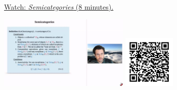 
\begin{minipage}{10cm}
    \href{https://act4e-spring21.netlify.app/videos/spring2021-semicats-cats:semicats.html}{Watch: \emph{Semicategories} (8 minutes).}
        
    \href{https://act4e-spring21.netlify.app/videos/spring2021-semicats-cats:semicats.html}{\includegraphics[height=3.5cm]{spring2021-semicats-cats:semicats/thumbnails.jpg}}
    \href{https://act4e-spring21.netlify.app/videos/spring2021-semicats-cats:semicats.html}{\includegraphics[height=2.5cm]{spring2021-semicats-cats:semicats/qrcode.png}}
\end{minipage}
